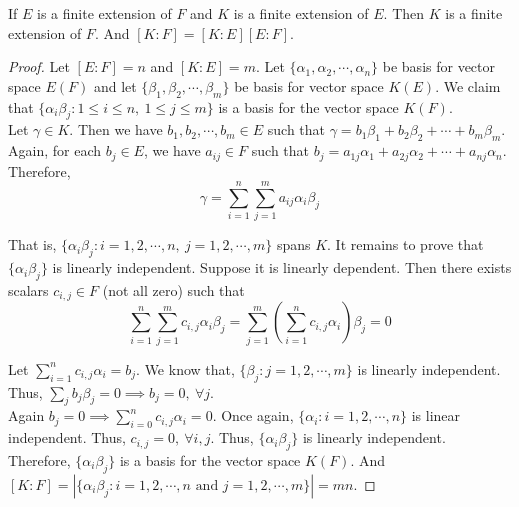 \begin{theorem}
	If $E$ is a finite extension of $F$ and $K$ is a finite extension of $E$.
	Then $K$ is a finite extension of $F$.
	And $[K:F] = [K:E][E:F]$.
\end{theorem}
\begin{proof}
	Let $[E:F] = n$ and $[K:E] = m$.
	Let $\{ \alpha_1,\alpha_2,\cdots,\alpha_n \}$ be basis for vector space $E(F)$ and let $\{ \beta_1,\beta_2,\cdots,\beta_m\}$ be basis for vector space $K(E)$.
	We claim that $\{\alpha_i\beta_j : 1 \le i \le n,\ 1 \le j \le m \}$ is a basis for the vector space $K(F)$.\\

	Let $\gamma \in K$.
	Then we have $b_1,b_2,\cdots,b_m \in E$ such that $\gamma = b_1\beta_1+b_2\beta_2+\cdots+b_m\beta_m$.
	Again, for each $b_j \in E$, we have $a_{ij} \in F$ such that $b_j = a_{1j}\alpha_1+a_{2j}\alpha_2+\cdots+a_{nj}\alpha_n$.
	Therefore, 
	$$\gamma = \sum_{i=1}^n \sum_{j=1}^m a_{ij} \alpha_i \beta_j$$

	That is, $\{ \alpha_i \beta_j : i =1,2,\cdots,n,\ j=1,2,\cdots,m \}$ spans $K$.
	It remains to prove that $\{\alpha_i \beta_j \}$ is linearly independent.
	Suppose it is linearly dependent.
	Then there exists scalars $c_{i,j} \in F$ (not all zero) such that
	$$\sum_{i=1}^n \sum_{j=1}^m c_{i,j} \alpha_i \beta_j  = \sum_{j=1}^m \left( \sum_{i=1}^n c_{i,j} \alpha_i \right) \beta_j  = 0$$
	
	Let $\sum_{i=1}^n c_{i,j}\alpha_i = b_j$.
	We know that, $\{ \beta_j : j = 1,2,\cdots,m \}$ is linearly independent.
	Thus, $\sum_j b_j \beta_j = 0 \implies b_j = 0,\ \forall j$.\\
	

	Again $b_j = 0 \implies \sum_{i = 0}^n c_{i,j}\alpha_i = 0$.
	Once again, $\{ \alpha_i : i = 1,2,\cdots,n \}$ is linear independent.
	Thus, $c_{i,j} = 0,\ \forall i,j$.
	Thus, $\{ \alpha_i \beta_j \}$ is linearly independent.
	Therefore, $\{ \alpha_i \beta_j \}$ is a basis for the vector space $K(F)$.
	And $[K : F] = |\{\alpha_i \beta_j : i =1,2,\cdots,n \text{ and } j=1,2,\cdots,m\}|= mn$.
\end{proof}

